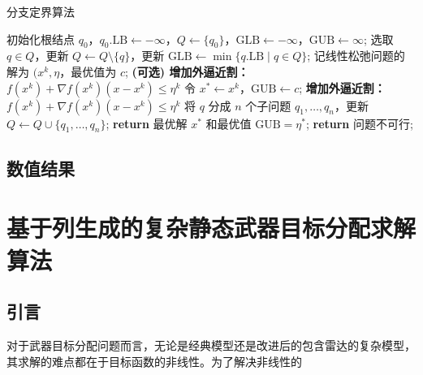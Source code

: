 \begin{algorithm}[!htbp]
    \small
    \caption{分支定界算法}\label{alg:branch_and_bound}
    \begin{algorithmic}[1]
        \State 初始化根结点 $q_0$，$q_0.\text{LB} \gets -\infty$，$Q \gets \{q_0\}$，$\text{GLB} \gets -\infty$，$\text{GUB} \gets \infty$;
            \State 选取 $q \in Q$，更新 $Q \gets Q \setminus \{q\}$，更新 $\text{GLB} \gets \min\{q.\text{LB} \mid q \in Q\}$;
                \State 记线性松弛问题的解为 $(x^k, \eta$，最优值为 $c$;
                    \State \textbf{(可选) 增加外逼近割：$f(x^k) + \nabla f(x^k) (x - x^k) \leq \eta^k$}
                \EndIf
                        \State 令 $x^* \gets x^k$，$\text{GUB} \gets c$;
                            \State \textbf{增加外逼近割：$f(x^k) + \nabla f(x^k) (x - x^k) \leq \eta^k$}
                        \EndIf
                    \Else
                        \State 将 $q$ 分成 $n$ 个子问题 $q_1, \ldots, q_n$，更新 $Q \gets Q \cup \{q_1, \ldots, q_n\}$;
                    \EndIf
                \EndIf
            \EndIf
        \EndWhile
            \State \textbf{return} 最优解 $x^*$ 和最优值 $\text{GUB} = \eta^*$;
        \Else
            \State \textbf{return} 问题不可行;
        \EndIf
        \EndProcedure
    \end{algorithmic}
\end{algorithm}

\section{数值结果}


\chapter{基于列生成的复杂静态武器目标分配求解算法}
\section{引言}
对于武器目标分配问题而言，无论是经典模型还是改进后的包含雷达的复杂模型，其求解的难点都在于目标函数的非线性。为了解决非线性的

